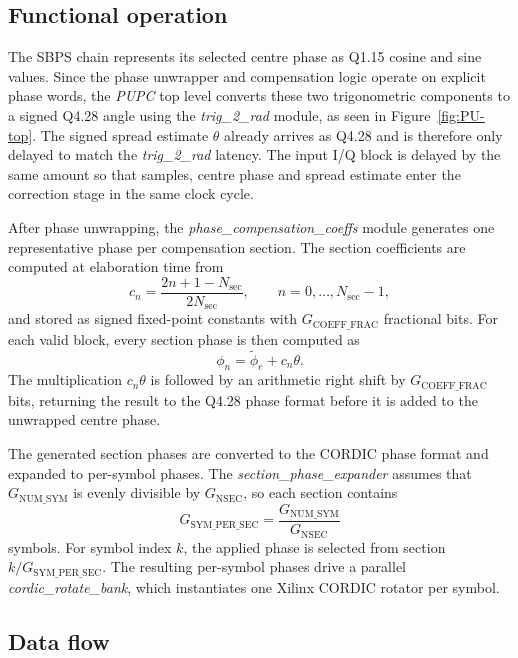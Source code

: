 \subsection{Functional operation}

The \ac{SBPS} chain represents its selected centre phase as Q1.15 cosine and sine values. Since the phase unwrapper and compensation logic operate on explicit phase words, the \textit{PUPC} top level converts these two trigonometric components to a signed Q4.28 angle using the \textit{trig\_2\_rad} module, as seen in Figure~\ref{fig:PU-top}. The signed spread estimate \(\theta\) already arrives as Q4.28 and is therefore only delayed to match the \textit{trig\_2\_rad} latency. The input I/Q block is delayed by the same amount so that samples, centre phase and spread estimate enter the correction stage in the same clock cycle.

After phase unwrapping, the \textit{phase\_compensation\_coeffs} module generates one representative phase per compensation section. The section coefficients are computed at elaboration time from
\begin{equation}
    c_n =
    \frac{2n+1-N_{\mathrm{sec}}}{2N_{\mathrm{sec}}},
    \qquad n=0,\ldots,N_{\mathrm{sec}}-1,
\end{equation}
and stored as signed fixed-point constants with \(G_{\mathrm{COEFF\_FRAC}}\) fractional bits. For each valid block, every section phase is then computed as
\begin{equation}\label{eq:comp_sections}
    \phi_n = \tilde{\phi}_e + c_n \theta .
\end{equation}
The multiplication \(c_n\theta\) is followed by an arithmetic right shift by \(G_{\mathrm{COEFF\_FRAC}}\) bits, returning the result to the Q4.28 phase format before it is added to the unwrapped centre phase.

The generated section phases are converted to the CORDIC phase format and expanded to per-symbol phases. The \textit{section\_phase\_expander} assumes that \(G_{\mathrm{NUM\_SYM}}\) is evenly divisible by \(G_{\mathrm{NSEC}}\), so each section contains
\[
    G_{\mathrm{SYM\_PER\_SEC}} =
    \frac{G_{\mathrm{NUM\_SYM}}}{G_{\mathrm{NSEC}}}
\]
symbols. For symbol index \(k\), the applied phase is selected from section \(k/G_{\mathrm{SYM\_PER\_SEC}}\). The resulting per-symbol phases drive a parallel \textit{cordic\_rotate\_bank}, which instantiates one Xilinx CORDIC rotator per symbol.

\subsection{Data flow}

